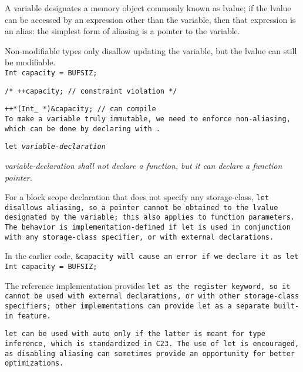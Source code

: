 A variable designates a memory object commonly known as lvalue;
if the lvalue can be accessed by an expression other than the variable,
then that expression is an alias:
the simplest form of aliasing is a pointer to the variable.

\example Non-modifiable types only disallow updating the variable,
but the lvalue can still be modifiable.\\

\tt{Int capacity = BUFSIZ;}

\tt{/* ++capacity; // constraint violation */}

\tt{++*(Int_ *)&capacity; // can compile}\\

To make a variable truly immutable, we need to enforce non-aliasing,
which can be done by declaring with .


\tt{let} \it{variable-declaration}


\it{variable-declaration} shall not declare a function,
but it can declare a function pointer.


For a block scope declaration that does not specify any storage-class,
\tt{let} disallows aliasing,
so a pointer cannot be obtained to the lvalue designated by the variable;
this also applies to function parameters.
The behavior is implementation-defined if \tt{let} is used in conjunction
with any storage-class specifier, or with external declarations.

\example In the earlier code, \tt{&capacity} will cause an
error if we declare it as \tt{let Int capacity = BUFSIZ;}


The reference implementation provides \tt{let} as the \tt{register} keyword,
so it cannot be used with external declarations,
or with other storage-class specifiers;
other implementations can provide \tt{let} as a separate built-in feature.

\note \tt{let} can be used with \tt{auto} only if the latter
is meant for type inference, which is standardized in C23.
The use of \tt{let} is encouraged, as disabling aliasing
can sometimes provide an opportunity for better optimizations.
